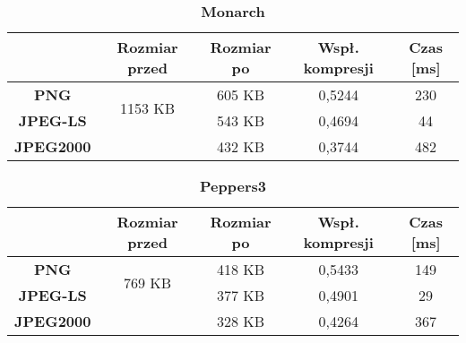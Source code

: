 \begin{table}[!h]
	\centering
	\caption{\textbf{Monarch}}
	\label{my-label}
	\begin{tabular}{|c|c|c|c|c|}                                             
		\hline
		& \textbf{Rozmiar przed} & \textbf{Rozmiar po} & \textbf{Wspł. kompresji} & \textbf{Czas {[}ms{]}} \\ \hline 
		\textbf{PNG}      &          \multicolumn{1}{c|}{\multirow{2}{*}{1153 KB}}             &      605 KB               &          0,5244                &            230                 \\\cline{3-5}
		\textbf{JPEG-LS}  &                        &       543 KB             &        0,4694                  &        44                  \\\cline{3-5}
		\textbf{JPEG2000} &                        &      432 KB               &         0,3744                 &       482               \\ \hline
	\end{tabular}
\end{table}

\begin{table}[!h]
	\centering
	\caption{\textbf{Peppers3}}
	\label{my-label}
	\begin{tabular}{|c|c|c|c|c|}                                             
		\hline
		& \textbf{Rozmiar przed} & \textbf{Rozmiar po} & \textbf{Wspł. kompresji} & \textbf{Czas {[}ms{]}} \\ \hline 
		\textbf{PNG}      &          \multicolumn{1}{c|}{\multirow{2}{*}{769 KB}}             &         418 KB            &        0,5433                  &         149                    \\\cline{3-5}
		\textbf{JPEG-LS}  &                        &          377 KB           &         0,4901                 &          29                \\\cline{3-5}
		\textbf{JPEG2000} &                        &        328 KB             &      0,4264                    &      367                \\ \hline
	\end{tabular}
\end{table}

